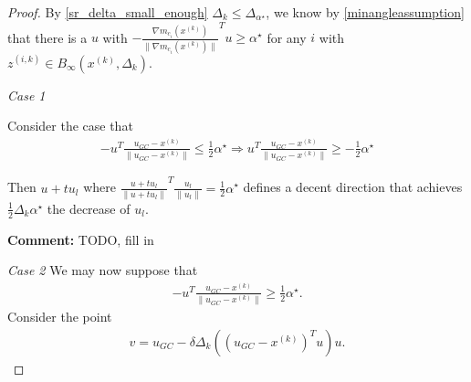 \documentclass{article}
\newenvironment{comment}
  {\par\medskip
   \color{red}%
   \begin{framed}
   \textbf{Comment: }\ignorespaces}
 {\end{framed}
  \medskip}
\theoremstyle{case}
\newcommand{\xk}{{x^{(k)}}}
\newcommand{\dk}{\Delta_k}
\newcommand{\zik}{{z^{(i, k)}}}
\newcommand{\gmcik}{{\nabla m_{c_i}(\xk)}}
\newcommand{\minangledelta}{{\Delta_{\alpha^{\star}}}}
\newcommand{\minanglealpha}{{ \alpha^{\star} }}
\newcommand{\tr}{{ B_{\infty}\left(\xk, \dk\right) }}
\begin{document}
\begin{proof}


By \cref{sr_delta_small_enough} $\dk \le \minangledelta$, we know by \cref{minangleassumption}
that there is a $u$ with $-\frac {\gmcik}{\|\gmcik\|} ^Tu \ge \minanglealpha$ for any $i$ with $\zik \in \tr$.

\emph{Case 1}

Consider the case that
\begin{align*}
-u^T \frac{u_{GC}- \xk}{\|u_{GC} - \xk\|} \le \frac 1 2 \minanglealpha \Longrightarrow u^T \frac{u_{GC} - \xk}{\|u_{GC}- \xk\|} \ge -\frac 1 2\minanglealpha
\end{align*}


Then $u + t u_l$ where $\frac{u + t u_l}{\|u + t u_l\|}^T\frac{u_l}{\|u_l\|} = \frac 1 2\minanglealpha$  defines a decent direction that achieves $\frac 1 2 \dk \minanglealpha$ the decrease of $u_l$.

\begin{comment}
TODO, fill in
\end{comment}

\emph{Case 2}
We may now suppose that 
\begin{align}
-u^T \frac{u_{GC}- \xk}{\|u_{GC} - \xk\|} \ge \frac 1 2 \minanglealpha. \label{sr_case_2}
\end{align}
Consider the point 
\begin{align}
v = u_{GC} - \delta \dk \left(\left(u_{GC}- \xk\right)^T u\right)u. \label{define_v}
\end{align}



\end{proof}
\end{document}
